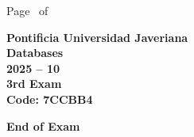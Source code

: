 \documentclass[11pt, addpoints]{exam}\usepackage[utf8]{inputenc}
\begin{document}
\begin{coverpages}
\begin{center}
			\vspace{3mm}
			\leavevmode \hspace{5mm} 
		\end{center}
	\end{coverpages}

	\footer{} {Page \thepage\ of \numpages} {}

	\centering
	\textbf{\Large Pontificia Universidad Javeriana}\\
	\textbf{\Large Databases} \\
	\textbf{\large 2025 -- 10} \\
	\textbf{\large 3rd Exam} \\
	\textbf{Code: 7CCBB4}


	\begin{questions}
		
		
		
		
		
		
		
		
		
		
		
		
		
		
		
		
		
		
		
		
	\end{questions}

	\vspace{5mm}
	\noindent \textbf{End of Exam}
\end{document}
